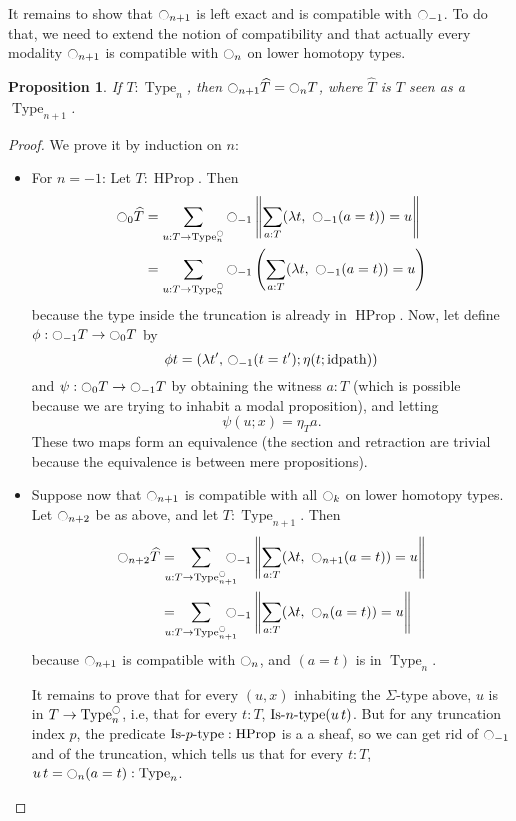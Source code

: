 \documentclass[conference]{IEEEtran}
\newtheorem{prop}[thm]{Proposition}
\newcommand{\ie}{i.e,\xspace}
\DeclareMathOperator{\Type}{Type}
\DeclareMathOperator{\HProp}{HProp}
\def\mymathhyphen{{\hbox{-}}}
\newcommand{\IsType}[1]
{\mathop{\mathrm{Is\mymathhyphen}#1\mathrm{\mymathhyphen type}} }
\newcommand{\modal}{\ensuremath{\ocircle}}
\begin{document}
It remains to show that $\modal_{n+1}$ is left exact and is compatible
with $\modal_{-1}$. To do that, we need to extend the notion of
compatibility and that actually every modality $\modal_{n+1}$ is
compatible with $\modal_n$ on lower homotopy types.
\begin{prop}
  If $T:\Type_n$, then $\modal_{n+1} \widehat T = \modal_n T$, where $\widehat T$ is $T$ seen as a
  $\Type_{n+1}$.
\end{prop}
\begin{proof}
  We prove it by induction on $n$:
  \begin{itemize}
  \item For $n=-1$: Let $T:\HProp$. Then
    \begin{align*}
      \modal_{0} \widehat T &= \sum_{u:T \to \Type_n^\modal} \modal_{-1}\left\| \sum_{a:T} 
      (\lambda t,~\modal_{-1} (a=t)) = u\right\| \\
      &= \sum_{u:T \to \Type_n^\modal} \modal_{-1}\left( \sum_{a:T} 
      (\lambda t,~\modal_{-1} (a=t)) = u\right)
    \end{align*}
    because the type inside the truncation is already in $\HProp$.
    Now, let define $\phi : \modal_{-1} T \to \modal_0T$ by
    $$\phi t = (\lambda t',\, \modal_{-1}(t=t') ; \eta
    (t;\mathrm{idpath}))$$
    and $\psi : \modal_0T\to \modal_{-1} T$ by obtaining the
    witness $a:T$ (which is possible because we are trying to inhabit
    a modal proposition), and letting
    $$\psi (u;x) = \eta_T a.$$
    These two maps form an equivalence (the section and retraction are
    trivial because the equivalence is between mere propositions).
  \item Suppose now that $\modal_{n+1}$ is compatible with all $\modal_k$ on
    lower homotopy types. Let $\modal_{n+2}$ be as above, and let
    $T:\Type_{n+1}$. Then
    \begin{align*}
      \modal_{n+2} \widehat  T &= \hspace{-1em} \sum_{u:T \to \Type_{n+1}^\modal}
                       \hspace{-1em} \modal_{-1}\left\| \sum_{a:T} 
            (\lambda t,~\modal_{n+1} (a=t)) = u\right\| \\
                     &= \hspace{-1em} \sum_{u:T \to
                       \Type_{n+1}^\modal} 
\hspace{-1em} \modal_{-1}\left\| \sum_{a:T} 
            (\lambda t,~\modal_{n} (a=t)) = u\right\|
    \end{align*}
    because $\modal_{n+1}$ is compatible with $\modal_{n}$, and
    $(a=t)$ is in $\Type_n$.

    It remains to prove that for every $(u,x)$ inhabiting the
    $\Sigma$-type above, $u$ is in $T\to\Type_n^\modal$, \ie that for
    every $t:T$, $\IsType n (u\, t)$.  But for any truncation index $p$,
    the predicate $\IsType p:\HProp$ is a a sheaf, so we can get rid
    of $\modal_{-1}$ and of the truncation, which tells us that for
    every 
    $t:T$, $u\, t = \modal_n(a=t) : \Type_n$.
  \end{itemize}
\end{proof}
\end{document}
